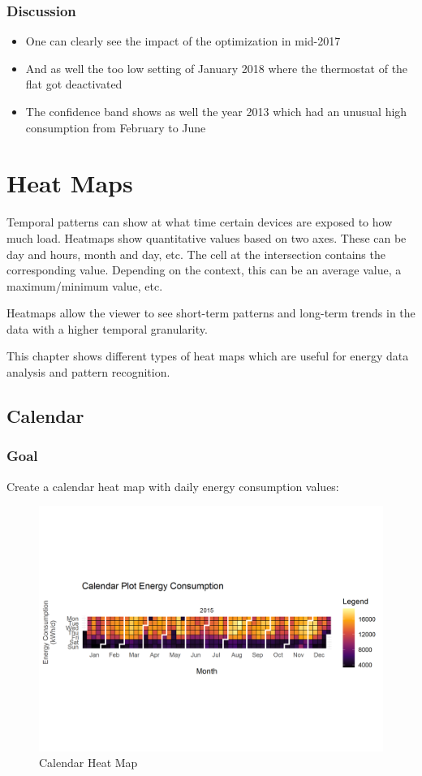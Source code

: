 \documentclass[
  a4paperpaper,
]{book}
\begin{document}
\hypertarget{discussion-4}{%
\subsection{Discussion}\label{discussion-4}}

\begin{itemize}
\item
  One can clearly see the impact of the optimization in mid-2017
\item
  And as well the too low setting of January 2018 where the thermostat of the flat got deactivated
\item
  The confidence band shows as well the year 2013 which had an unusual high consumption from February to June
\end{itemize}

\hypertarget{heat-maps}{%
\chapter{Heat Maps}\label{heat-maps}}

Temporal patterns can show at what time certain devices are exposed to how much load. Heatmaps show quantitative values based on two axes. These can be day and hours, month and day, etc. The cell at the intersection contains the corresponding value. Depending on the context, this can be an average value, a maximum/minimum value, etc.

Heatmaps allow the viewer to see short-term patterns and long-term trends in the data with a higher temporal granularity.

This chapter shows different types of heat maps which are useful for energy data analysis and pattern recognition.

\newpage

\hypertarget{calendar}{%
\section{Calendar}\label{calendar}}

\hypertarget{goal-10}{%
\subsection{Goal}\label{goal-10}}

Create a calendar heat map with daily energy consumption values:

\begin{figure}
\includegraphics[width=0.7\linewidth]{images/plotHeatMapCalendar} \caption{Calendar Heat Map}\label{fig:unnamed-chunk-19}
\end{figure}
\end{document}
